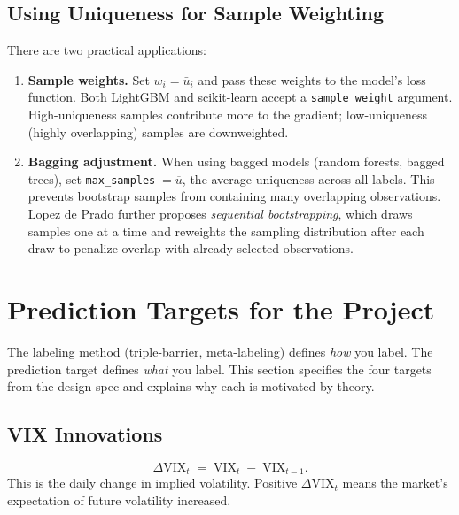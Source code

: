 \subsection{Using Uniqueness for Sample Weighting}

There are two practical applications:

\begin{enumerate}[leftmargin=2em]
\item \textbf{Sample weights.}
Set $w_i = \bar{u}_i$ and pass these weights to the model's loss
function.
Both LightGBM and scikit-learn accept a \texttt{sample\_weight}
argument.
High-uniqueness samples contribute more to the gradient;
low-uniqueness (highly overlapping) samples are downweighted.

\item \textbf{Bagging adjustment.}
When using bagged models (random forests, bagged trees), set
\texttt{max\_samples}$\;= \overline{u}$, the average uniqueness across
all labels.
This prevents bootstrap samples from containing many overlapping
observations.
Lopez de Prado further proposes \emph{sequential bootstrapping},
which draws samples one at a time and reweights the sampling
distribution after each draw to penalize overlap with
already-selected observations.
\end{enumerate}


\section{Prediction Targets for the Project}
\label{sec:prediction-targets}

The labeling method (triple-barrier, meta-labeling) defines \emph{how}
you label.
The prediction target defines \emph{what} you label.
This section specifies the four targets from the design spec and
explains why each is motivated by theory.

\subsection{VIX Innovations}

\begin{definition}
\begin{equation}
\label{eq:vix-innovation}
\Delta \text{VIX}_t \;=\; \text{VIX}_t \;-\; \text{VIX}_{t-1}.
\end{equation}
This is the daily change in implied volatility.
Positive $\Delta\text{VIX}_t$ means the market's expectation of
future volatility increased.
\end{definition}

